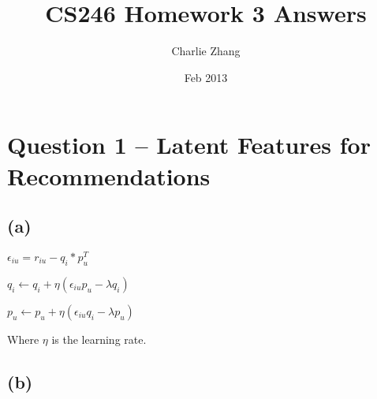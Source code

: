 \documentclass{article}
\title{CS246 Homework 3 Answers}
\author{Charlie Zhang}
\date{Feb 2013}
\begin{document}
\maketitle
\section{Question 1 -- Latent Features for Recommendations}


\subsection{(a)}
$\epsilon_{iu} = r_{iu} - q_i * p_u^T$

$q_i \leftarrow q_i + \eta(\epsilon_{iu}p_u - \lambda q_i)$

$p_u \leftarrow p_u + \eta(\epsilon_{iu}q_i - \lambda p_u)$

Where $\eta$ is the learning rate.

\subsection{(b)}
\end{document}
